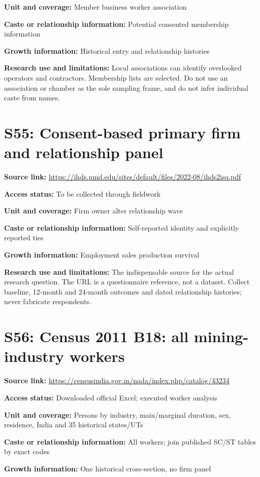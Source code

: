 \documentclass[11pt,a4paper]{report}
\begin{document}
\textbf{Unit and coverage:} Member business worker association

\textbf{Caste or relationship information:} Potential consented membership information

\textbf{Growth information:} Historical entry and relationship histories

\textbf{Research use and limitations:} Local associations can identify overlooked operators and contractors. Membership lists are selected. Do not use an association or chamber as the sole sampling frame, and do not infer individual caste from names.

\section{S55: Consent-based primary firm and relationship panel}\hypertarget{S55}{}
\textbf{Source link:} \url{https://ihds.umd.edu/sites/default/files/2022-08/ihds2isq.pdf}

\textbf{Access status:} To be collected through fieldwork

\textbf{Unit and coverage:} Firm owner alter relationship wave

\textbf{Caste or relationship information:} Self-reported identity and explicitly reported ties

\textbf{Growth information:} Employment sales production survival

\textbf{Research use and limitations:} The indispensable source for the actual research question. The URL is a questionnaire reference, not a dataset. Collect baseline, 12-month and 24-month outcomes and dated relationship histories; never fabricate respondents.

\section{S56: Census 2011 B18: all mining-industry workers}\hypertarget{S56}{}
\textbf{Source link:} \url{https://censusindia.gov.in/nada/index.php/catalog/43234}

\textbf{Access status:} Downloaded official Excel; executed worker analysis

\textbf{Unit and coverage:} Persons by industry, main/\allowbreak{}marginal duration, sex, residence, India and 35 historical states/\allowbreak{}UTs

\textbf{Caste or relationship information:} All workers; join published SC/\allowbreak{}ST tables by exact codes

\textbf{Growth information:} One historical cross-section, no firm panel
\end{document}
